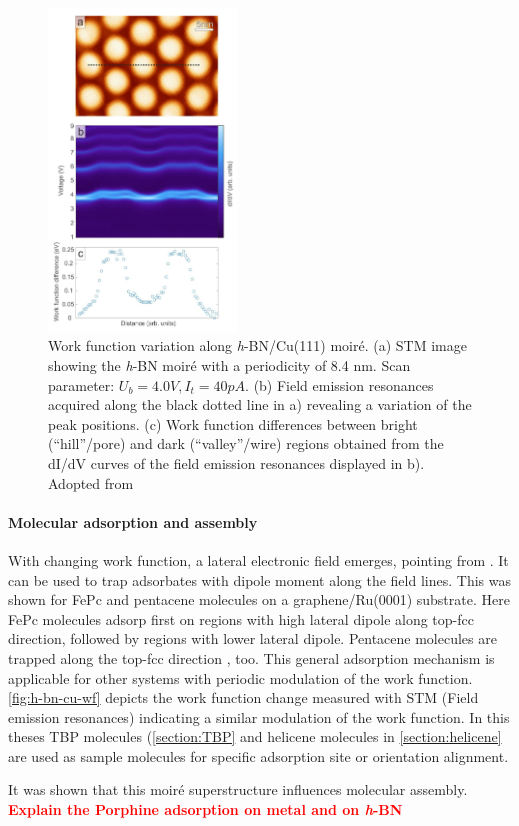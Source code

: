 \begin{figure}\centering
	\includegraphics[width=5cm]{./images/h-BN-Cu(111)-wf-change}
	\caption{Work function variation along \textit{h}-BN/Cu(111) moir\'e. (a) STM image showing the \textit{h}-BN moir\'e with a periodicity of 8.4 nm. Scan parameter: $U_b= 4.0 V, I_t= 40 pA$. (b)	Field emission resonances acquired along the black dotted line in a) revealing a variation of the peak positions. (c) Work  function  differences  between bright  (“hill”/pore)  and  dark  (“valley”/wire)  regions obtained  from  the  dI/dV curves  of  the  field emission  resonances  displayed  in  b). Adopted from \cite{schwarz_corrugation_2017}}
	\label{fig:h-bn-cu-wf}
\end{figure}

\paragraph{Molecular adsorption and assembly}

With changing work function, a lateral electronic field emerges, pointing from \underline{\qquad \qquad}. It can be used to trap adsorbates with dipole moment along the field lines. This was shown for FePc and pentacene molecules on a graphene/Ru(0001) substrate. Here FePc molecules adsorp first on regions with high lateral dipole along top-fcc direction, followed by regions with lower lateral dipole. Pentacene molecules are trapped along the top-fcc direction \cite{zhang_assembly_2011}, too. This general adsorption mechanism is applicable for other systems with periodic modulation of the work function. \autoref{fig:h-bn-cu-wf} depicts the work function change measured  with STM (Field emission resonances) indicating a similar modulation of the work function. In this theses TBP molecules (\autoref{section:TBP} and helicene molecules in \autoref{section:helicene} are used as sample molecules for specific adsorption site or orientation alignment.

It was shown that this moir\'e superstructure influences molecular assembly. 
\textcolor{red}{\textbf{Explain the Porphine adsorption on metal and on \textit{h}-BN}}


